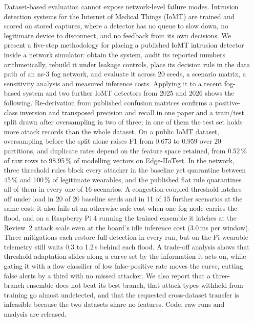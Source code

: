 Dataset-based evaluation cannot expose network-level failure modes. Intrusion detection systems for the Internet of Medical Things (IoMT) are trained and scored on stored captures, where a detector has no queue to slow down, no legitimate device to disconnect, and no feedback from its own decisions. We present a five-step methodology for placing a published IoMT intrusion detector inside a network simulator: obtain the system, audit its reported numbers arithmetically, rebuild it under leakage controls, place its decision rule in the data path of an ns-3 fog network, and evaluate it across 20 seeds, a scenario matrix, a sensitivity analysis and measured inference costs. Applying it to a recent fog-based system and two further IoMT detectors from 2025 and 2026 shows the following. Re-derivation from published confusion matrices confirms a positive-class inversion and transposed precision and recall in one paper and a train/test split drawn after oversampling in two of three; in one of them the test set holds more attack records than the whole dataset. On a public IoMT dataset, oversampling before the split alone raises F1 from 0.673 to 0.959 over 20 partitions, and duplicate rates depend on the feature space retained, from 0.52\,\% of raw rows to 98.95\,\% of modelling vectors on Edge-IIoTset. In the network, three threshold rules block every attacker in the baseline yet quarantine between 45\,\% and 100\,\% of legitimate wearables, and the published flat rule quarantines all of them in every one of 16 scenarios. A congestion-coupled threshold latches off under load in 20 of 20 baseline seeds and in 11 of 15 further scenarios at the same cost; it also fails at an otherwise safe cost when one fog node carries the flood, and on a Raspberry Pi 4 running the trained ensemble it latches at the Review~2 attack scale even at the board's idle inference cost (3.0\,ms per window). Three mitigations each restore full detection in every run, but on the Pi wearable telemetry still waits 0.3 to 1.2\,s behind each flood. A trade-off analysis shows that threshold adaptation slides along a curve set by the information it acts on, while gating it with a flow classifier of low false-positive rate moves the curve, cutting false alerts by a third with no missed attacker. We also report that a three-branch ensemble does not beat its best branch, that attack types withheld from training go almost undetected, and that the requested cross-dataset transfer is infeasible because the two datasets share no features. Code, raw runs and analysis are released.
